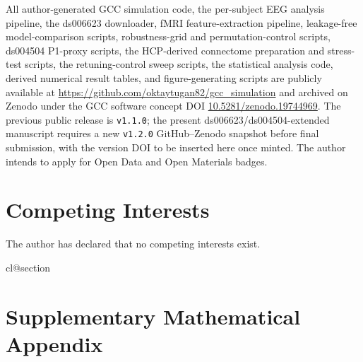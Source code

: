 \documentclass[11pt,a4paper]{article}
\theoremstyle{plain}
\theoremstyle{definition}
\theoremstyle{remark}
\begin{document}
All author-generated GCC simulation code, the per-subject EEG analysis pipeline, the ds006623 downloader, fMRI feature-extraction pipeline, leakage-free model-comparison scripts, robustness-grid and permutation-control scripts, ds004504 P1-proxy scripts, the HCP-derived connectome preparation and stress-test scripts, the retuning-control sweep scripts, the statistical analysis code, derived numerical result tables, and figure-generating scripts are publicly available at \url{https://github.com/oktaytugan82/gcc_simulation} and archived on Zenodo under the GCC software concept DOI \href{https://doi.org/10.5281/zenodo.19744969}{10.5281/zenodo.19744969}. The previous public release is \texttt{v1.1.0}; the present ds006623/ds004504-extended manuscript requires a new \texttt{v1.2.0} GitHub--Zenodo snapshot before final submission, with the version DOI to be inserted here once minted. The author intends to apply for Open Data and Open Materials badges.

\section*{Competing Interests}

The author has declared that no competing interests exist.

\appendix
\makeatletter
\providecommand*{\@removefromreset}[2]{%
  \let\@tempa\@elt
  \let\@elt\relax
  \expandafter\let\expandafter\@tempb\csname cl@#2\endcsname
  \expandafter\def\csname cl@#2\endcsname{}%
  \def\@elt##1{%
    \ifx ##1#1\else
      \expandafter\@temptokena\expandafter{\csname cl@#2\endcsname}%
      \edef\x{\noexpand\expandafter\noexpand\def\noexpand\csname cl@#2\noexpand\endcsname{\the\@temptokena \noexpand\@elt{##1}}}\x
    \fi}%
  \@tempb
  \let\@elt\@tempa}
\@removefromreset{theorem}{section}
\makeatother
\section*{Supplementary Mathematical Appendix}
\label{sec:appendix}
\setcounter{section}{0}
\setcounter{theorem}{0}
\renewcommand{\thesection}{A.\arabic{section}}
\renewcommand{\thesubsection}{A.\arabic{section}.\arabic{subsection}}
\renewcommand{\thetheorem}{A.\arabic{theorem}}
\end{document}
